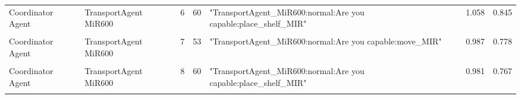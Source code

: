 \begin{table}[htbp]
\begin{tabular}{m{} m{} m{} m{} m{} m{} m{}}
    Coordinator Agent & TransportAgent MiR600 & 6  & 60  & "TransportAgent\_MiR600:normal:Are you capable:place\_shelf\_MIR"                                                                                                                                                                                                                                                                                                                                                                                                                                                                                                                                                                                                                        & 1.058 & 0.845 \\ 
    & & & & & &\\
    Coordinator Agent & TransportAgent MiR600 & 7  & 53  & "TransportAgent\_MiR600:normal:Are you capable:move\_MIR"                                                                                                                                                                                                                                                                                                                                                                                                                                                                                                                                                                                                                                & 0.987 & 0.778 \\ 
    & & & & & &\\
    Coordinator Agent & TransportAgent MiR600 & 8  & 60  & "TransportAgent\_MiR600:normal:Are you capable:place\_shelf\_MIR"                                                                                                                                                                                                                                                                                                                                                                                                                                                                                                                                                                                                                        & 0.981 & 0.767 \\ 
    & & & & & &\\

\end{tabular}
\end{table}
